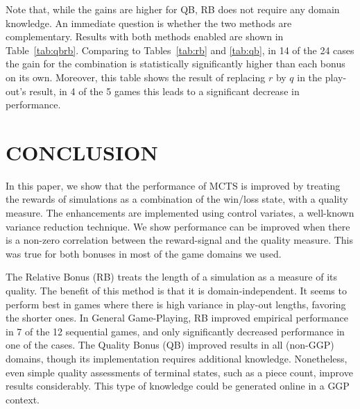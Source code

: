 \documentclass{ecai2014}
\begin{document}
Note that, while the gains are higher for QB, RB does not require any domain knowledge. An immediate question is whether the two methods are complementary. Results with both methods enabled are shown in Table~\ref{tab:qbrb}. Comparing to Tables~\ref{tab:rb} and \ref{tab:qb}, in 14 of the 24 cases the gain for the combination is statistically significantly higher than each bonus on its own. Moreover, this table shows the result of replacing $r$ by $q$ in the play-out's result, in 4 of the 5 games this leads to a significant decrease in performance. 

\section{CONCLUSION}
\label{sec:concl}
In this paper, we show that the performance of MCTS is improved by treating the rewards of simulations as a combination of the win/loss state, with a quality measure. The enhancements are implemented using control variates, a well-known variance reduction technique. We show performance can be improved when there is a non-zero correlation between the reward-signal and the quality measure. This was true for both bonuses in most of the game domains we used. 

The Relative Bonus (RB) treats the length of a simulation as a measure of its quality. The benefit of this method is that it is domain-independent. It seems to perform best in games where there is high variance in play-out lengths, favoring the shorter ones. 
In General Game-Playing, RB improved empirical performance in 7 of the 12 sequential games, 
and only significantly decreased performance in one of the cases. 
The Quality Bonus (QB) improved results in all (non-GGP) domains, though its implementation requires additional knowledge. Nonetheless, even simple quality assessments of terminal states, such as a piece count, improve results considerably. This type of knowledge could be generated online in a GGP context. 
\end{document}
